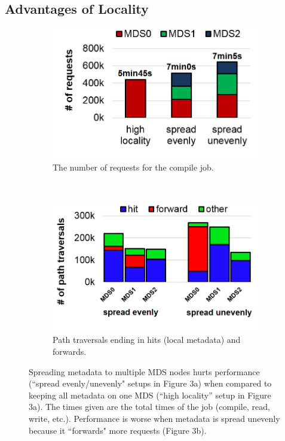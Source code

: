 \subsection{Advantages of Locality}
\label{advantages_of_locality}
\begin{figure}[tbh]
	\begin{subfigure}[H]{0.45\textwidth}
		\centering	
	\caption{The number of requests for the compile job.  \label{figure:workload-tar-requests-total}}
		
\includegraphics[width=1\textwidth]{./chapters/mantle/workload-tar-requests2.png}
	\end{subfigure}
	~
	\begin{subfigure}[H]{0.47\textwidth}
		\centering
		\caption{Path traversals ending in hits (local metadata) and forwards. \label{figure:workload-tar-traverses}}	
	\includegraphics[width=1\textwidth]{./chapters/mantle/workload-tar-traverses2.png}
	\end{subfigure}	
	\caption{Spreading metadata to multiple MDS nodes hurts performance (``spread evenly/unevenly" setups in Figure 3a) when compared to keeping all metadata on one MDS (``high locality'' setup in Figure 3a). The times given are the total times of the job (compile, read, write, etc.). Performance is worse when metadata is spread unevenly because it ``forwards" more requests (Figure 3b).\label{figure:workload-tar-requests}}
\end{figure}

